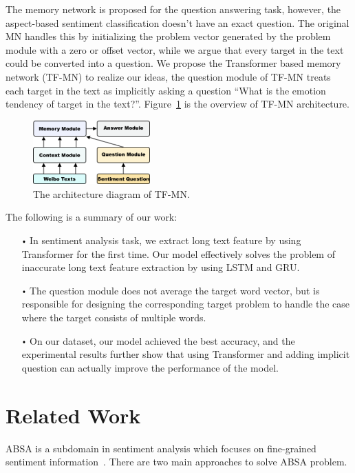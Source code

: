 \documentclass[runningheads, twocolumn]{llncs}
\begin{document}
The memory network is proposed for the question answering task, however, the aspect-based sentiment classification doesn’t have an exact question. The original MN handles this by initializing the problem vector generated by the problem module with a zero or offset vector, while we argue that every target in the text could be converted into a question. We propose the Transformer based memory network (TF-MN) to realize our ideas, the question module of TF-MN treats each target in the text as implicitly asking a question “What is the emotion tendency of target in the text?”. Figure~\ref{TF-MN} is the overview of TF-MN architecture.

\begin{figure}[htb]
	\includegraphics[width=0.4\textwidth]{TF-MN.png}
	\centering
	\caption{The architecture diagram of TF-MN.}\label{TF-MN}
\end{figure}

 The following is a summary of our work:

\begin{itemize}
	\item[$\vcenter{\hbox{\tiny$\bullet$}}$] In sentiment analysis task, we extract long text feature by using Transformer for the first time. Our model effectively solves the problem of inaccurate long text feature extraction by using LSTM and GRU.
	\item[$\vcenter{\hbox{\tiny$\bullet$}}$] The question module does not average the target word vector, but is responsible for designing the corresponding target problem to handle the case where the target consists of multiple words.
	\item[$\vcenter{\hbox{\tiny$\bullet$}}$] On our dataset, our model achieved the best accuracy, and the experimental results further show that using Transformer and adding implicit question can actually improve the performance of the model.
\end{itemize}

\section{Related Work}
ABSA is a subdomain in sentiment analysis which focuses on fine-grained sentiment information~\cite{DBLP:series/synthesis/2012Liu}. There are two main approaches to solve ABSA problem.
\end{document}
